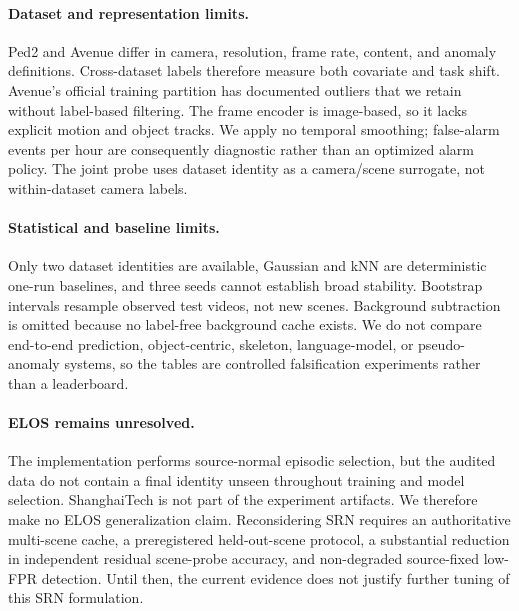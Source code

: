 \paragraph{Dataset and representation limits.}
Ped2 and Avenue differ in camera, resolution, frame rate, content, and anomaly definitions. Cross-dataset labels therefore measure both covariate and task shift. Avenue's official training partition has documented outliers that we retain without label-based filtering. The frame encoder is image-based, so it lacks explicit motion and object tracks. We apply no temporal smoothing; false-alarm events per hour are consequently diagnostic rather than an optimized alarm policy. The joint probe uses dataset identity as a camera/scene surrogate, not within-dataset camera labels.

\paragraph{Statistical and baseline limits.}
Only two dataset identities are available, Gaussian and kNN are deterministic one-run baselines, and three seeds cannot establish broad stability. Bootstrap intervals resample observed test videos, not new scenes. Background subtraction is omitted because no label-free background cache exists. We do not compare end-to-end prediction, object-centric, skeleton, language-model, or pseudo-anomaly systems, so the tables are controlled falsification experiments rather than a leaderboard.

\paragraph{ELOS remains unresolved.}
The implementation performs source-normal episodic selection, but the audited data do not contain a final identity unseen throughout training and model selection. ShanghaiTech is not part of the experiment artifacts. We therefore make no ELOS generalization claim. Reconsidering SRN requires an authoritative multi-scene cache, a preregistered held-out-scene protocol, a substantial reduction in independent residual scene-probe accuracy, and non-degraded source-fixed low-FPR detection. Until then, the current evidence does not justify further tuning of this SRN formulation.
